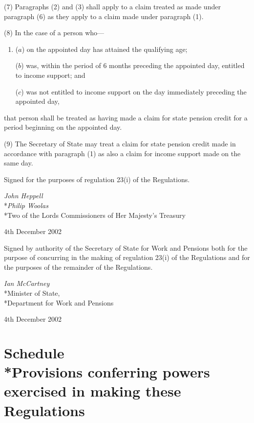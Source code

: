 \documentclass[12pt,a4paper]{article}
\begin{document}
(7) Paragraphs (2) and (3) shall apply to a claim treated as made under paragraph (6) as they apply to a claim made under paragraph (1).

(8) In the case of a person who—
\begin{enumerate}\item[]
($a$) on the appointed day has attained the qualifying age;

($b$) was, within the period of 6 months preceding the appointed day, entitled to income support; and

($c$) was not entitled to income support on the day immediately preceding the appointed day,
\end{enumerate}
that person shall be treated as having made a claim for state pension credit for a period beginning on the appointed day.

(9) The Secretary of State may treat a claim for state pension credit made in accordance with paragraph (1) as also a claim for income support made on the same day. 

\bigskip

 Signed 
for the purposes of regulation 23(i)  of the Regulations.

{\raggedleft
\emph{John Heppell}\\*\emph{Philip Woolas}\\*Two of the Lords Commissioners of Her Majesty's Treasury

}


4th December 2002

\bigskip

 Signed 
by authority of the Secretary of State for Work and Pensions
both for the purpose of concurring in the making of regulation 23(i)  of the Regulations and for the purposes of the remainder of the Regulations. 

{\raggedleft
\emph{Ian McCartney}\\*Minister of State,\\*Department for Work and Pensions

}


4th December 2002


\small

\part[Schedule --- Provisions conferring powers exercised in making these Regulations]{Schedule\\*Provisions conferring powers exercised in making these Regulations}
\end{document}
